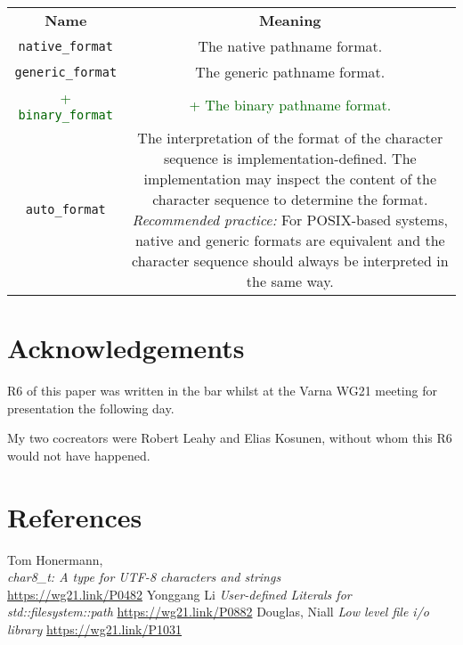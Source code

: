 \documentclass[11pt]{article}
\newcommand{\code}[2][cpp]{\lstinline[language=#1,basicstyle=\small\ttfamily]{#2}}
\newcommand{\tsreplace}[3]{\textcolor{red}{\sout{#1}}#2\textcolor{darkgreen}{#3}}
\begin{document}
\begin{center}
\begin{tabular}{|c c|}
\hline
\bf{Name} & \bf{Meaning}\\
\texttt{native\_format} & The native pathname format.\\
\texttt{generic\_format} & The generic pathname format.\\
\color{darkgreen}
\tsreplace{}{}{+ \code{binary_format}} & \tsreplace{}{}{+ The binary pathname format.}\\
\color{black}
\texttt{auto\_format} &
The interpretation of the format of the character sequence is implementation-defined.
The implementation may inspect the content of the character sequence to determine the format.
\emph{Recommended practice:} For POSIX-based systems, native and generic formats are equivalent and the character sequence should always be interpreted in the same way.\\
\end{tabular}
\end{center}

\color{black}

\section{Acknowledgements}

R6 of this paper was written in the bar whilst at the Varna WG21 meeting
for presentation the following day.

My two cocreators were Robert Leahy and Elias Kosunen, without whom this
R6 would not have happened.

\section{References}
\let\oldsection=\section
\renewcommand{\section}[2]{}%
\begin{thebibliography}{9}
    Tom Honermann,\\
    \emph{char8\_t: A type for UTF-8 characters and strings}\\
    \url{https://wg21.link/P0482}
    Yonggang Li\newline
    \emph{User-defined Literals for std::filesystem::path}\newline
    \url{https://wg21.link/P0882}
    Douglas, Niall\newline
    \emph{Low level file i/o library}\newline
    \url{https://wg21.link/P1031}
\end{thebibliography}
\let\section=\oldsection
\end{document}
